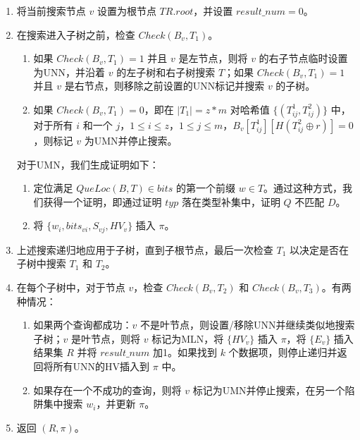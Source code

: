 \documentclass{cumcmthesis}
\numberwithin{equation}{section} %
\numberwithin{figure}{section} %
\numberwithin{table}{section} %
\begin{document}
\begin{enumerate}
    \item 将当前搜索节点 $v$ 设置为根节点 $TR.root$，并设置 $result\_num = 0$。
    \item 在搜索进入子树之前，检查 $Check(B_v, T_1)$。
        \begin{enumerate}[label=(\arabic*)]
            \item 如果 $Check(B_v, T_1) = 1$ 并且 $v$ 是左节点，则将 $v$ 的右子节点临时设置为UNN，并沿着 $v$ 的左子树和右子树搜索 $T$；如果 $Check(B_v, T_1) = 1$ 并且 $v$ 是右节点，则移除之前设置的UNN标记并搜索 $v$ 的子树。
            \item 如果 $Check(B_v, T_1) = 0$，即在 $|T_1| = z * m$ 对哈希值 $\{(T_{ij}^{1}, T_{ij}^{2})\}$ 中，对于所有 $i$ 和一个 $j$，$1 \leq i \leq z$，$1 \leq j \leq m$，$B_v[T_{ij}^{1}][H(T_{ij}^{2} \oplus r)] = 0$，则标记 $v$ 为UMN并停止搜索。
        \end{enumerate}
        对于UMN，我们生成证明如下：
        \begin{enumerate}[label=(\arabic*)]
            \item 定位满足 $QueLoc (B, T) \in bits$ 的第一个前缀 $w \in T$。通过这种方式，我们获得一个证明，即通过证明 $typ$ 落在类型补集中，证明 $Q$ 不匹配 $D$。
            \item 将 $\{w_i, bits_{vi}, S_{vj}, HV_{v}\}$ 插入 $\pi$。
        \end{enumerate}
    \item 上述搜索递归地应用于子树，直到子根节点，最后一次检查 $T_1$ 以决定是否在子树中搜索 $T_1$ 和 $T_2$。
    \item 在每个子树中，对于节点 $v$，检查 $Check(B_v, T_2)$ 和 $Check(B_v, T_3)$。有两种情况：
        \begin{enumerate}[label=(\arabic*)]
            \item 如果两个查询都成功：$v$ 不是叶节点，则设置/移除UNN并继续类似地搜索子树；$v$ 是叶节点，则将 $v$ 标记为MLN，将 $\{HV_v\}$ 插入 $\pi$，将 $\{E_v\}$ 插入结果集 $R$ 并将 $result\_num$ 加1。如果找到 $k$ 个数据项，则停止递归并返回将所有UNN的HV插入到 $\pi$ 中。
            \item 如果存在一个不成功的查询，则将 $v$ 标记为UMN并停止搜索，在另一个陷阱集中搜索 $w_i$，并更新 $\pi$。
        \end{enumerate}
    \item 返回 $(R, \pi)$。
\end{enumerate}
\end{document}
